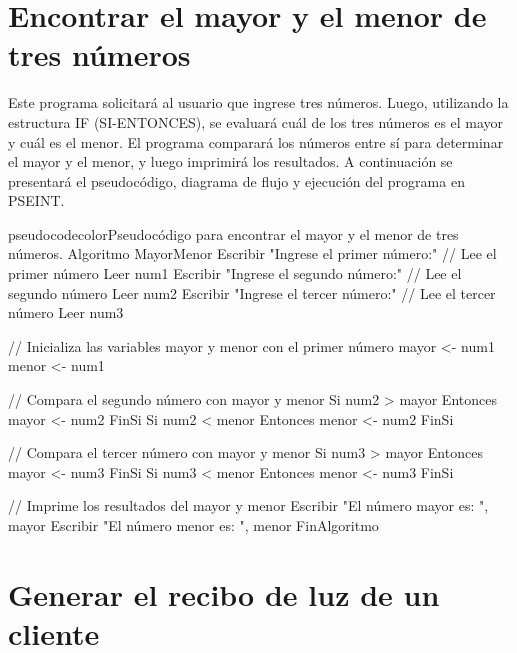 \section{Encontrar el mayor y el menor de tres números}

Este programa solicitará al usuario que ingrese tres números. Luego, utilizando la estructura IF (SI-ENTONCES), se evaluará cuál de los tres números es el mayor y cuál es el menor. El programa comparará los números entre sí para determinar el mayor y el menor, y luego imprimirá los resultados. A continuación se presentará el pseudocódigo, diagrama de flujo y ejecución del programa en PSEINT.

\begin{sourcecode}{pseudocodecolor}{Pseudocódigo para encontrar el mayor y el menor de tres números.}
Algoritmo MayorMenor
    Escribir "Ingrese el primer número:"
    // Lee el primer número
    Leer num1
    Escribir "Ingrese el segundo número:"
    // Lee el segundo número
    Leer num2
    Escribir "Ingrese el tercer número:"
    // Lee el tercer número
    Leer num3
    
    // Inicializa las variables mayor y menor con el primer número
    mayor <- num1
    menor <- num1
    
    // Compara el segundo número con mayor y menor
    Si num2 > mayor Entonces
        mayor <- num2
    FinSi
    Si num2 < menor Entonces
        menor <- num2
    FinSi
    
    // Compara el tercer número con mayor y menor
    Si num3 > mayor Entonces
        mayor <- num3
    FinSi
    Si num3 < menor Entonces
        menor <- num3
    FinSi
    
    // Imprime los resultados del mayor y menor
    Escribir "El número mayor es: ", mayor
    Escribir "El número menor es: ", menor
FinAlgoritmo
\end{sourcecode}



\section{Generar el recibo de luz de un cliente}

